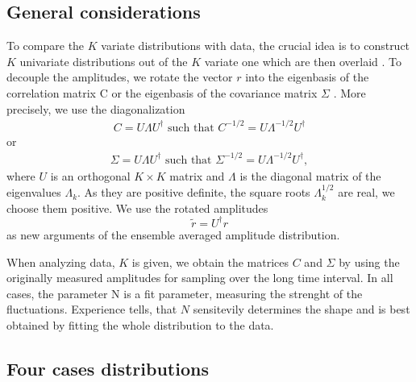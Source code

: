 \subsection{General considerations}\label{subsec:general_considerations}

To compare the $K$ variate distributions with data, the crucial idea is to
construct $K$ univariate distributions out of the $K$ variate one which are
then overlaid \cite{exact_distributions_guhr}. To decouple the amplitudes, we
rotate the vector $r$ into the eigenbasis of the correlation matrix C or the
eigenbasis of the covariance matrix $\Sigma$
\cite{non_stationarity_fin_guhr,exact_distributions_guhr}. More precisely, we
use the diagonalization
\begin{align}
    C = U \Lambda U^{\dagger} \text{ such that }
    C^{-1/2} = U \Lambda^{-1/2} U^{\dagger}
\end{align}
or
\begin{align}
    \Sigma = U \Lambda U^{\dagger} \text{ such that }
    \Sigma^{-1/2} = U \Lambda^{-1/2} U^{\dagger},
\end{align}
where $U$ is an orthogonal $K \times K$ matrix and $\Lambda$ is the diagonal
matrix of the eigenvalues $\Lambda_{k}$. As they are positive definite, the
square roots $\Lambda_{k}^{1/2}$ are real, we choose them positive. We use the
rotated amplitudes
\begin{equation}
    \tilde{r} = U^{\dagger} r
\end{equation}
as new arguments of the ensemble averaged amplitude distribution.

When analyzing data, $K$ is given, we obtain the matrices $C$ and $\Sigma$ by
using the originally measured amplitudes for sampling over the long time interval.
In all cases, the parameter N is a fit parameter, measuring the strenght of the
fluctuations. Experience tells, that $N$ sensitevily determines the shape and is
best obtained by fitting the whole distribution to the data.

\subsection{Four cases distributions}\label{subsec:distributions}

